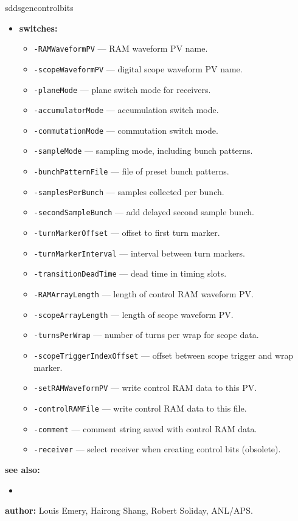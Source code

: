 \begin{sddsprog}{sddsgencontrolbits}
\begin{itemize}
  \item \textbf{switches:}
  \begin{itemize}
    \item {\tt -RAMWaveformPV} --- RAM waveform PV name.
    \item {\tt -scopeWaveformPV} --- digital scope waveform PV name.
    \item {\tt -planeMode} --- plane switch mode for receivers.
    \item {\tt -accumulatorMode} --- accumulation switch mode.
    \item {\tt -commutationMode} --- commutation switch mode.
    \item {\tt -sampleMode} --- sampling mode, including bunch patterns.
    \item {\tt -bunchPatternFile} --- file of preset bunch patterns.
    \item {\tt -samplesPerBunch} --- samples collected per bunch.
    \item {\tt -secondSampleBunch} --- add delayed second sample bunch.
    \item {\tt -turnMarkerOffset} --- offset to first turn marker.
    \item {\tt -turnMarkerInterval} --- interval between turn markers.
    \item {\tt -transitionDeadTime} --- dead time in timing slots.
    \item {\tt -RAMArrayLength} --- length of control RAM waveform PV.
    \item {\tt -scopeArrayLength} --- length of scope waveform PV.
    \item {\tt -turnsPerWrap} --- number of turns per wrap for scope data.
    \item {\tt -scopeTriggerIndexOffset} --- offset between scope trigger and wrap marker.
    \item {\tt -setRAMWaveformPV} --- write control RAM data to this PV.
    \item {\tt -controlRAMFile} --- write control RAM data to this file.
    \item {\tt -comment} --- comment string saved with control RAM data.
    \item {\tt -receiver} --- select receiver when creating control bits (obsolete).
  \end{itemize}
\end{itemize}

\item \textbf{see also:}
\begin{itemize}
  \item {}
\end{itemize}
\item \textbf{author:} Louis Emery, Hairong Shang, Robert Soliday, ANL/APS.
\end{sddsprog}
